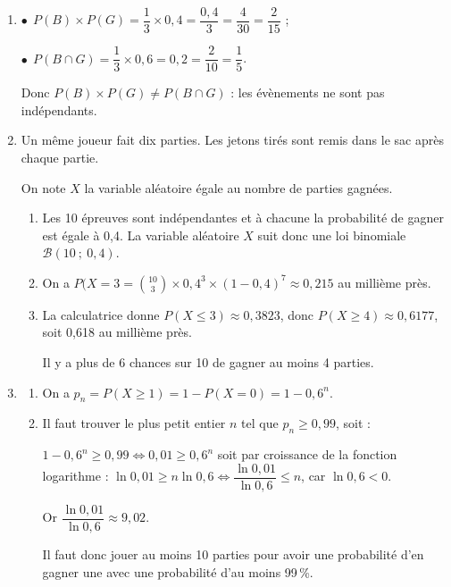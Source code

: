 \documentclass[10pt]{article}
\begin{document}
\begin{enumerate}
\begin{enumerate}
$\bullet~~$$P(B \cap G) = P(B) \times P_B(G) = \dfrac13 \times 0,6 = \dfrac{0,6}{3} = 0,2$ ; 

$\bullet~~$$P(R \cap G) = P(R) \times P_R(G) = \dfrac23 \times 0,3 = \dfrac{0,6}{3} = 0,2$.

Donc $P(G) = 0,2 + 0,2 = 0,4$.
		\item 
		

Il faut trouver $P_G(B) = \dfrac{P(G \cap B)}{P(G)} = \dfrac{P(B \cap G)}{P(G)} = \dfrac{0,2}{0,4} = \dfrac2 = 0,5$.
	\end{enumerate}
\item 
$\bullet~~$$P(B) \times P(G) = \dfrac13 \times 0,4 = \dfrac{0,4}{3} = \dfrac{4}{30} = \dfrac{2}{15}$ ;

$\bullet~~$$P(B \cap G) = \dfrac13 \times 0,6 = 0,2 = \dfrac{2}{10} = \dfrac15$.

Donc $P(B) \times P(G) \ne P(B \cap G)$ : les évènements ne sont pas indépendants.
\item Un même joueur fait dix parties. Les jetons tirés sont remis dans le sac après chaque partie.

On note $X$ la variable aléatoire égale au nombre de parties gagnées.
	\begin{enumerate}
		\item 
	Les 10 épreuves sont indépendantes et à chacune la probabilité de gagner est égale à 0,4. La variable aléatoire $X$ suit donc une loi binomiale $\mathcal{B}(10~;~0,4)$.
		\item 
On a $P(X = 3 = \binom{10}{3} \times 0,4^3 \times (1 - 0,4)^7 \approx 0,215$ au millième près.
		\item 
		La calculatrice donne $P(X \leqslant 3) \approx 0,3823$, donc $P(X \geqslant 4) \approx 0,6177$, soit 0,618 au millième près.
		


Il y a plus de 6 chances sur 10 de gagner au moins 4 parties.
	\end{enumerate}
\item 
	\begin{enumerate}
		\item 
On a $p_n = P(X \geqslant 1) = 1 - P(X = 0) = 1 - 0,6^n$.
		\item 
		
Il faut trouver le plus petit entier $n$ tel que $p_n \geqslant 0,99$, soit :
		
$1 - 0,6^n \geqslant 0,99 \iff 0,01 \geqslant 0,6^n$ soit par croissance de la fonction logarithme : $\ln 0,01 \geqslant n \ln 0,6 \iff \dfrac{\ln 0,01}{\ln 0,6} \leqslant n$, car $\ln 0,6 < 0$.
		
Or $\dfrac{\ln 0,01}{\ln 0,6} \approx 9,02$.
		
Il faut donc jouer au moins 10 parties pour avoir une probabilité d'en gagner une avec une probabilité d'au moins 99\,\%.
	\end{enumerate}
\end{enumerate}

\bigskip
\end{document}
